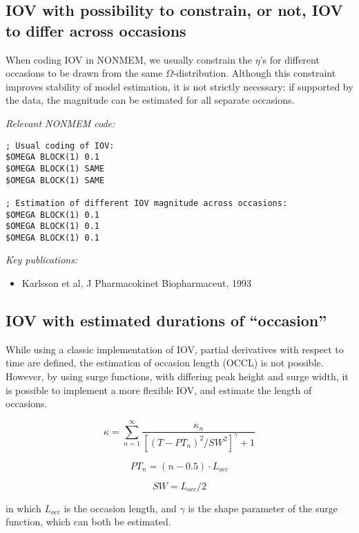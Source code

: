 \documentclass[a4paper,11pt]{article}
\begin{document}
\subsection{IOV with possibility to constrain, or not, IOV to differ across occasions}
When coding IOV in NONMEM, we usually constrain the $\eta$'s for
different occasions to be drawn from the same
$\Omega$-distribution. Although this constraint improves stability of
model estimation, it is not strictly necessary: if supported by the
data, the magnitude can be estimated for all separate occasions.

\vspace{10pt}
\noindent \emph{Relevant NONMEM code:}
\begin{lstlisting}
; Usual coding of IOV:
$OMEGA BLOCK(1) 0.1
$OMEGA BLOCK(1) SAME
$OMEGA BLOCK(1) SAME

; Estimation of different IOV magnitude across occasions:
$OMEGA BLOCK(1) 0.1
$OMEGA BLOCK(1) 0.1
$OMEGA BLOCK(1) 0.1
\end{lstlisting}

\noindent \emph{Key publications:}
\begin{itemize}
\item Karlsson et al, J Pharmacokinet Biopharmaceut, 1993
\end{itemize}

\subsection{IOV with estimated durations of “occasion”}
While using a classic implementation of IOV, partial derivatives with
respect to time are defined, the estimation of occasion length (OCCL)
is not possible. However, by using surge functions, with differing
peak height and surge width, it is possible to implement a more
flexible IOV, and estimate the length of occasions.

\begin{equation}
\kappa = \displaystyle\sum\limits_{n=1}^\infty \frac{\kappa_n}{\left[ (T-PT_n)^2 / SW^2 \right]^{\gamma} + 1}
\end{equation}

\begin{equation}
PT_n = (n - 0.5) \cdot L_{occ}
\end{equation}

\begin{equation}
SW = L_{occ} / 2
\end{equation}

\noindent in which $L_{occ}$ is the occasion length, and $\gamma$ is
the shape parameter of the surge function, which can both be
estimated.
\end{document}
